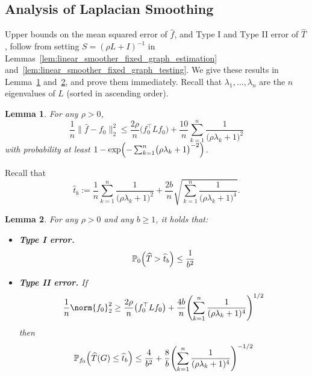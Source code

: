 \documentclass[twoside]{article}
\newcommand{\1}{\mathbf{1}}
\newcommand{\Lap}{L}
\newcommand{\Pbb}{\mathbb{P}}
\newcommand{\wh}[1]{\widehat{#1}}
\newtheorem{lemma}{Lemma}
\theoremstyle{definition}
\theoremstyle{remark}
\begin{document}
\subsection{Analysis of Laplacian Smoothing}
Upper bounds on the mean squared error of $\wh{f}$, and Type I and Type II error of $\wh{T}$, follow from setting $S = (\rho L + I)^{-1}$ in Lemmas~\ref{lem:linear_smoother_fixed_graph_estimation} and~\ref{lem:linear_smoother_fixed_graph_testing}. We give these results in Lemma~\ref{lem:ls_fixed_graph_estimation} and~\ref{lem:ls_fixed_graph_testing}, and prove them immediately. Recall that $\lambda_1,\ldots,\lambda_n$ are the $n$ eigenvalues of $\Lap$ (sorted in ascending order).
\begin{lemma}
	\label{lem:ls_fixed_graph_estimation}
	For any $\rho > 0$,
	\begin{equation}
	\label{eqn:ls_fixed_graph_estimation_prob}
	\frac{1}{n}\bigl\|\wh{f} - f_0\bigr\|_2^2 \leq \frac{2\rho}{n} \bigl(f_0^{\top} \Lap f_0\bigr) + \frac{10}{n}\sum_{k = 1}^{n} \frac{1}{\bigl(\rho \lambda_{k} + 1\bigr)^2}
	\end{equation}
	with probability at least $1 - \exp\Bigl(-\sum_{k = 1}^{n}\bigl(\rho \lambda_k + 1\bigr)^{-2}\Bigr)$.
\end{lemma}
Recall that 
\begin{equation*}
\wh{t}_b := \frac{1}{n}\sum_{k = 1}^{n} \frac{1}{\bigl(\rho \lambda_k + 1\bigr)^2} + \frac{2b}{n}\sqrt{\sum_{k = 1}^{n} \frac{1}{\bigl(\rho \lambda_k + 1\bigr)^4}}.
\end{equation*}
\begin{lemma}
	\label{lem:ls_fixed_graph_testing}
	For any $\rho > 0$ and any $b \geq 1$, it holds that:
	\begin{itemize}
		\item \textbf{Type I error.}
		\begin{equation}
		\label{eqn:ls_fixed_graph_testing_typeI}
		\Pbb_0\Bigl(\wh{T} > \wh{t}_b\Bigr) \leq \frac{1}{b^2}
		\end{equation}
		\item \textbf{Type II error.} If
		\begin{equation}
		\label{eqn:ls_fixed_graph_testing_critical_radius}
		\frac{1}{n}\norm{f_0}_2^2 \geq \frac{2 \rho}{n} \bigl(f_0^{\top} \Lap f_0\bigr) + \frac{4b}{n} \Biggl(\sum_{k = 1}^{n} \frac{1}{(\rho\lambda_k + 1)^4} \Biggr)^{1/2}
		\end{equation}
		then
		\begin{equation}
		\label{eqn:ls_fixed_graph_testing_typeII}
		\Pbb_{f_0}\Bigl(\wh{T}(G) \leq \wh{t}_b\Bigr) \leq \frac{4}{b^2} + \frac{8}{b} \Biggl(\sum_{k = 1}^{n} \frac{1}{(\rho\lambda_k + 1)^4} \Biggr)^{-1/2}
		\end{equation}
	\end{itemize}
\end{lemma}
\end{document}

